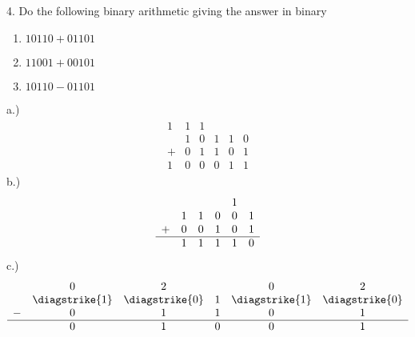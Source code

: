 \documentclass{report}
\begin{document}
    \pagebreak \bigbreak \noindent 
    \begin{mdframed}
        4. Do the following binary arithmetic giving the answer in binary
        \begin{enumerate}[label=\alph*.]
            \item $10110 + 01101$
            \item $11001 + 00101$
            \item $10110 - 01101$
        \end{enumerate}
    \end{mdframed}
    \bigbreak \noindent 
    a.)
    \begin{align*}
        \begin{array}{cccccc}
            1 & 1 & 1 &  &  &   \\
              &1&0&1&1&0 \\
              +& 0 & 1 & 1 & 0 & 1 \\
              \hline
              1 & 0 & 0 & 0 & 1 & 1
        \end{array}
    \end{align*}
    b.)
    \begin{align*}
        \begin{array}{cccccc}
            &&&&1& \\
            &1&1&0&0&1 \\
            +&0&0&1&0&1 \\
            \hline 
             &1&1&1&1&0
        \end{array}
    \end{align*}
    c.) 
    \begin{align*}
        \begin{array}{cccccc}
            &0&2&&0&2 \\
             &\diagstrike{1} & \diagstrike{0} & 1 & \diagstrike{1} & \diagstrike{0} \\
            -&0&1&1&0&1\\
            \hline 
             &0&1&0&0&1
        \end{array}
    \end{align*}
\end{document}
